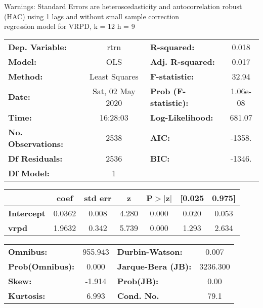 Warnings: \newline
 [1] Standard Errors are heteroscedasticity and autocorrelation robust (HAC) using 1 lags and without small sample correction\\ 

regression model for VRPD, k = 12 h = 9\begin{center}
\begin{tabular}{lclc}
\toprule
\textbf{Dep. Variable:}    &       rtrn       & \textbf{  R-squared:         } &     0.018   \\
\textbf{Model:}            &       OLS        & \textbf{  Adj. R-squared:    } &     0.017   \\
\textbf{Method:}           &  Least Squares   & \textbf{  F-statistic:       } &     32.94   \\
\textbf{Date:}             & Sat, 02 May 2020 & \textbf{  Prob (F-statistic):} &  1.06e-08   \\
\textbf{Time:}             &     16:28:03     & \textbf{  Log-Likelihood:    } &    681.07   \\
\textbf{No. Observations:} &        2538      & \textbf{  AIC:               } &    -1358.   \\
\textbf{Df Residuals:}     &        2536      & \textbf{  BIC:               } &    -1346.   \\
\textbf{Df Model:}         &           1      & \textbf{                     } &             \\
\bottomrule
\end{tabular}
\begin{tabular}{lcccccc}
                   & \textbf{coef} & \textbf{std err} & \textbf{z} & \textbf{P$> |$z$|$} & \textbf{[0.025} & \textbf{0.975]}  \\
\midrule
\textbf{Intercept} &       0.0362  &        0.008     &     4.280  &         0.000        &        0.020    &        0.053     \\
\textbf{vrpd}      &       1.9632  &        0.342     &     5.739  &         0.000        &        1.293    &        2.634     \\
\bottomrule
\end{tabular}
\begin{tabular}{lclc}
\textbf{Omnibus:}       & 955.943 & \textbf{  Durbin-Watson:     } &    0.007  \\
\textbf{Prob(Omnibus):} &   0.000 & \textbf{  Jarque-Bera (JB):  } & 3236.300  \\
\textbf{Skew:}          &  -1.914 & \textbf{  Prob(JB):          } &     0.00  \\
\textbf{Kurtosis:}      &   6.993 & \textbf{  Cond. No.          } &     79.1  \\
\bottomrule
\end{tabular}
\end{center}

